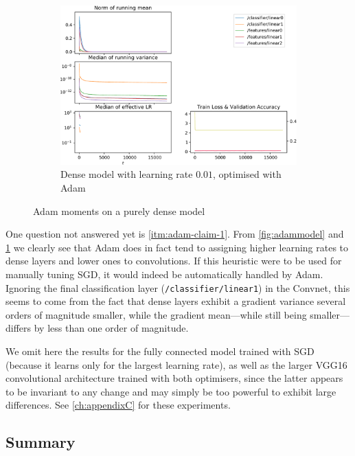 \begin{figure}
    \begin{subfigure}{\textwidth}
        \centering
        \includegraphics[width=\linewidth]{gfx/diagrams/experiments/adam/fullyconnectedmodel_adam_001_0_-1.pdf}
        \caption{Dense model with learning rate $0.01$, optimised with Adam}
    \end{subfigure}
    \label{fig:fully-connected-experiment}
    \caption{Adam moments on a purely dense model}
\end{figure}

One question not answered yet is \cref{itm:adam-claim-1}. From
\cref{fig:adammodel} and \cref{fig:fully-connected-experiment} we clearly see
that Adam does in fact tend to assigning higher learning rates to dense layers
and lower ones to convolutions. If this heuristic were to be used for manually
tuning SGD, it would indeed be automatically handled by Adam. Ignoring the final
classification layer (\texttt{/classifier/linear1}) in the Convnet, this seems
to come from the fact that dense layers exhibit a gradient variance several
orders of magnitude smaller, while the gradient mean---while still being
smaller---differs by less than one order of magnitude.

We omit here the results for the fully connected model trained with SGD (because
it learns only for the largest learning rate), as well as the larger VGG16
convolutional architecture trained with both optimisers, since the latter
appears to be invariant to any change and may simply be too powerful to exhibit
large differences. See \cref{ch:appendixC} for these experiments.

\subsection{Summary}

